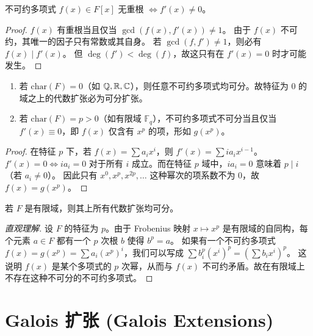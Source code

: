 \documentclass[11pt]{article}
\begin{document}
\begin{cnproperty}[判别准则]
    不可约多项式 $f(x) \in F[x]$ 无重根 $\iff f'(x) \neq 0$。
\end{cnproperty}

\begin{proof}
    $f(x)$ 有重根当且仅当 $\gcd(f(x), f'(x)) \neq 1$。
    由于 $f(x)$ 不可约，其唯一的因子只有常数或其自身。
    若 $\gcd(f, f') \neq 1$，则必有 $f(x) \mid f'(x)$。
    但 $\deg(f') < \deg(f)$，故这只有在 $f'(x) = 0$ 时才可能发生。
\end{proof}

\begin{cntheorem}[特征与可分性]
    \begin{enumerate}
        \item 若 $\text{char}(F) = 0$（如 $\mathbb{Q}, \mathbb{R}, \mathbb{C}$），则任意不可约多项式均可分。故特征为 0 的域之上的代数扩张必为可分扩张。
        \item 若 $\text{char}(F) = p > 0$（如有限域 $\mathbb{F}_q$），不可约多项式不可分当且仅当 $f'(x) \equiv 0$，即 $f(x)$ 仅含有 $x^p$ 的项，形如 $g(x^p)$。
    \end{enumerate}
\end{cntheorem}

\begin{proof}
    在特征 $p$ 下，若 $f(x) = \sum a_i x^i$，则 $f'(x) = \sum i a_i x^{i-1}$。
    $f'(x) = 0 \iff i a_i = 0$ 对于所有 $i$ 成立。而在特征 $p$ 域中，$i a_i = 0$ 意味着 $p \mid i$（若 $a_i \neq 0$）。
    因此只有 $x^{0}, x^p, x^{2p}, \dots$ 这种幂次的项系数不为 0，故 $f(x) = g(x^p)$。
\end{proof}

\begin{cnproperty}[有限域是完美的]
    若 $F$ 是有限域，则其上所有代数扩张均可分。
\end{cnproperty}

\begin{proof}[直观理解]
    设 $F$ 的特征为 $p$。由于 Frobenius 映射 $x \mapsto x^p$ 是有限域的自同构，每个元素 $a \in F$ 都有一个 $p$ 次根 $b$ 使得 $b^p = a$。
    如果有一个不可约多项式 $f(x) = g(x^p) = \sum a_i (x^p)^i$，我们可以写成 $\sum b_i^p (x^i)^p = (\sum b_i x^i)^p$。
    这说明 $f(x)$ 是某个多项式的 $p$ 次幂，从而与 $f(x)$ 不可约矛盾。故在有限域上不存在这种不可分的不可约多项式。
\end{proof}

\section{Galois 扩张 (Galois Extensions)}
\end{document}
